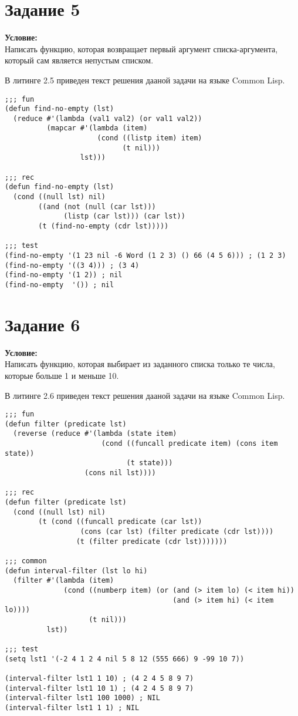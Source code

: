 \section{Задание \No{}5}
\textbf{Условие:}\\Написать функцию, которая возвращает первый аргумент списка-аргумента, который сам является непустым списком.

В литинге 2.5 приведен текст решения дааной задачи на языке Common Lisp.

\begin{lstlisting}[caption={Задание \No{}5}]
;;; fun
(defun find-no-empty (lst)
  (reduce #'(lambda (val1 val2) (or val1 val2))
          (mapcar #'(lambda (item)
                      (cond ((listp item) item)
                            (t nil)))
                  lst)))

;;; rec
(defun find-no-empty (lst)
  (cond ((null lst) nil)
        ((and (not (null (car lst)))
              (listp (car lst))) (car lst))
        (t (find-no-empty (cdr lst)))))

;;; test
(find-no-empty '(1 23 nil -6 Word (1 2 3) () 66 (4 5 6))) ; (1 2 3)
(find-no-empty '((3 4))) ; (3 4)
(find-no-empty '(1 2)) ; nil
(find-no-empty  '()) ; nil
\end{lstlisting}

\section{Задание \No{}6}
\textbf{Условие:}\\Написать функцию, которая выбирает из заданного списка только те числа, которые больше 1 и меньше 10.

В литинге 2.6 приведен текст решения дааной задачи на языке Common Lisp.

\begin{lstlisting}[caption={Задание \No{}6}]
;;; fun
(defun filter (predicate lst)
  (reverse (reduce #'(lambda (state item)
                       (cond ((funcall predicate item) (cons item state))
                             (t state)))
                   (cons nil lst))))

;;; rec
(defun filter (predicate lst)
  (cond ((null lst) nil)
        (t (cond ((funcall predicate (car lst))
                  (cons (car lst) (filter predicate (cdr lst))))
                 (t (filter predicate (cdr lst)))))))

;;; common
(defun interval-filter (lst lo hi)
  (filter #'(lambda (item)
              (cond ((numberp item) (or (and (> item lo) (< item hi))
                                        (and (> item hi) (< item lo))))
                    (t nil)))
          lst))

;;; test
(setq lst1 '(-2 4 1 2 4 nil 5 8 12 (555 666) 9 -99 10 7))

(interval-filter lst1 1 10) ; (4 2 4 5 8 9 7)
(interval-filter lst1 10 1) ; (4 2 4 5 8 9 7)
(interval-filter lst1 100 1000) ; NIL
(interval-filter lst1 1 1) ; NIL
\end{lstlisting}

